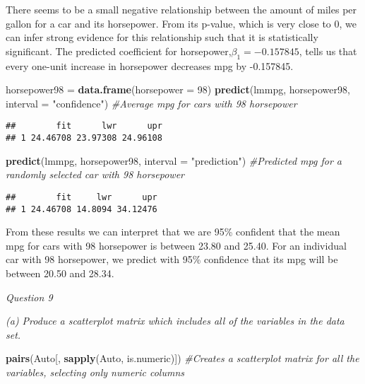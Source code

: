 \documentclass[
]{article}
\newenvironment{Shaded}{\begin{snugshade}}{\end{snugshade}}
\newcommand{\AttributeTok}[1]{\textcolor[rgb]{0.13,0.29,0.53}{#1}}
\newcommand{\CommentTok}[1]{\textcolor[rgb]{0.56,0.35,0.01}{\textit{#1}}}
\newcommand{\DecValTok}[1]{\textcolor[rgb]{0.00,0.00,0.81}{#1}}
\newcommand{\FunctionTok}[1]{\textcolor[rgb]{0.13,0.29,0.53}{\textbf{#1}}}
\newcommand{\NormalTok}[1]{#1}
\newcommand{\OtherTok}[1]{\textcolor[rgb]{0.56,0.35,0.01}{#1}}
\newcommand{\StringTok}[1]{\textcolor[rgb]{0.31,0.60,0.02}{#1}}
\begin{document}
There seems to be a small negative relationship between the amount of
miles per gallon for a car and its horsepower. From its p-value, which
is very close to \(0\), we can infer strong evidence for this
relationship such that it is statistically significant. The predicted
coefficient for horsepower,\(\beta_1 = -0.157845\), tells us that every
one-unit increase in horsepower decreases mpg by -0.157845.

\begin{Shaded}
\begin{Highlighting}[]
\NormalTok{horsepower98 }\OtherTok{=} \FunctionTok{data.frame}\NormalTok{(}\AttributeTok{horsepower =} \DecValTok{98}\NormalTok{)}
\FunctionTok{predict}\NormalTok{(lmmpg, horsepower98, }\AttributeTok{interval =} \StringTok{"confidence"}\NormalTok{) }\CommentTok{\#Average mpg for cars with 98 horsepower}
\end{Highlighting}
\end{Shaded}

\begin{verbatim}
##        fit      lwr      upr
## 1 24.46708 23.97308 24.96108
\end{verbatim}

\begin{Shaded}
\begin{Highlighting}[]
\FunctionTok{predict}\NormalTok{(lmmpg, horsepower98, }\AttributeTok{interval =}  \StringTok{"prediction"}\NormalTok{) }\CommentTok{\#Predicted mpg for a randomly selected car with 98 horsepower}
\end{Highlighting}
\end{Shaded}

\begin{verbatim}
##        fit     lwr      upr
## 1 24.46708 14.8094 34.12476
\end{verbatim}

From these results we can interpret that we are 95\% confident that the
mean mpg for cars with 98 horsepower is between 23.80 and 25.40. For an
individual car with 98 horsepower, we predict with 95\% confidence that
its mpg will be between 20.50 and 28.34.

\emph{Question 9}

\emph{(a) Produce a scatterplot matrix which includes all of the
variables in the data set.}

\begin{Shaded}
\begin{Highlighting}[]
\FunctionTok{pairs}\NormalTok{(Auto[, }\FunctionTok{sapply}\NormalTok{(Auto, is.numeric)]) }\CommentTok{\#Creates a scatterplot matrix for all the variables, selecting only numeric columns}
\end{Highlighting}
\end{Shaded}
\end{document}
